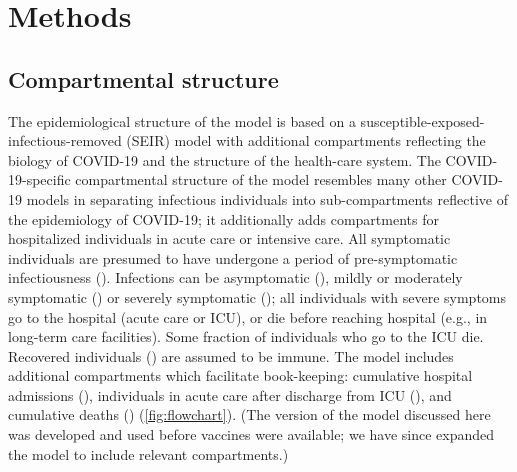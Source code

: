 \documentclass[12pt]{article}\usepackage[]{graphicx}\usepackage[]{color}
\begin{document}
\section{Methods}

\subsection*{Compartmental structure}

The epidemiological structure of the model is based on a susceptible-exposed-infectious-removed (SEIR) model with additional compartments reflecting the biology of COVID-19 and the structure of the health-care system. 
The COVID-19-specific compartmental structure of the model resembles many other COVID-19 models \cite{childs2021impact, tuite2020mathematical, kainChopping2021} in separating infectious individuals into sub-compartments reflective of the epidemiology of COVID-19; it additionally adds compartments for hospitalized individuals in acute care or intensive care. 
All symptomatic individuals are presumed to have undergone a period of pre-symptomatic infectiousness (). 
Infections can be asymptomatic (), mildly or moderately symptomatic () or severely symptomatic (); all individuals with severe symptoms go to the hospital (acute care or ICU), or die before reaching hospital (e.g., in long-term care facilities).
Some fraction  of individuals who go to the ICU die. Recovered individuals () are assumed to be immune.  
The model includes additional compartments which facilitate book-keeping: cumulative hospital admissions (), individuals in acute care after discharge from ICU (), and cumulative deaths () (\cref{fig:flowchart}).
(The version of the model discussed here was developed and used before vaccines were available; we have since expanded the model to include relevant compartments.)

\end{document}
